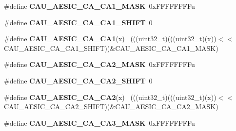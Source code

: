 \begin{DoxyCompactItemize}
\item 
\hypertarget{group___c_a_u___register___masks_gace8bbcda7b100e6febb77206a0b294ca}{}\#define {\bfseries C\+A\+U\+\_\+\+A\+E\+S\+I\+C\+\_\+\+C\+A\+\_\+\+C\+A1\+\_\+\+M\+A\+S\+K}~0x\+F\+F\+F\+F\+F\+F\+F\+Fu\label{group___c_a_u___register___masks_gace8bbcda7b100e6febb77206a0b294ca}

\item 
\hypertarget{group___c_a_u___register___masks_gaf213071e5350ac7fb8d15b65685e8fa8}{}\#define {\bfseries C\+A\+U\+\_\+\+A\+E\+S\+I\+C\+\_\+\+C\+A\+\_\+\+C\+A1\+\_\+\+S\+H\+I\+F\+T}~0\label{group___c_a_u___register___masks_gaf213071e5350ac7fb8d15b65685e8fa8}

\item 
\hypertarget{group___c_a_u___register___masks_gae23c1c036ff5b163a2fcfc170eb89e85}{}\#define {\bfseries C\+A\+U\+\_\+\+A\+E\+S\+I\+C\+\_\+\+C\+A\+\_\+\+C\+A1}(x)                                        ~(((uint32\+\_\+t)(((uint32\+\_\+t)(x))$<$$<$C\+A\+U\+\_\+\+A\+E\+S\+I\+C\+\_\+\+C\+A\+\_\+\+C\+A1\+\_\+\+S\+H\+I\+F\+T))\&C\+A\+U\+\_\+\+A\+E\+S\+I\+C\+\_\+\+C\+A\+\_\+\+C\+A1\+\_\+\+M\+A\+S\+K)\label{group___c_a_u___register___masks_gae23c1c036ff5b163a2fcfc170eb89e85}

\item 
\hypertarget{group___c_a_u___register___masks_gaacb6f7c612e15617ec7318cff9480c0f}{}\#define {\bfseries C\+A\+U\+\_\+\+A\+E\+S\+I\+C\+\_\+\+C\+A\+\_\+\+C\+A2\+\_\+\+M\+A\+S\+K}~0x\+F\+F\+F\+F\+F\+F\+F\+Fu\label{group___c_a_u___register___masks_gaacb6f7c612e15617ec7318cff9480c0f}

\item 
\hypertarget{group___c_a_u___register___masks_ga24294c0df349c7b5264631d50b683247}{}\#define {\bfseries C\+A\+U\+\_\+\+A\+E\+S\+I\+C\+\_\+\+C\+A\+\_\+\+C\+A2\+\_\+\+S\+H\+I\+F\+T}~0\label{group___c_a_u___register___masks_ga24294c0df349c7b5264631d50b683247}

\item 
\hypertarget{group___c_a_u___register___masks_gac53e6eb0ead797b56e9c2e44a149fd81}{}\#define {\bfseries C\+A\+U\+\_\+\+A\+E\+S\+I\+C\+\_\+\+C\+A\+\_\+\+C\+A2}(x)                                        ~(((uint32\+\_\+t)(((uint32\+\_\+t)(x))$<$$<$C\+A\+U\+\_\+\+A\+E\+S\+I\+C\+\_\+\+C\+A\+\_\+\+C\+A2\+\_\+\+S\+H\+I\+F\+T))\&C\+A\+U\+\_\+\+A\+E\+S\+I\+C\+\_\+\+C\+A\+\_\+\+C\+A2\+\_\+\+M\+A\+S\+K)\label{group___c_a_u___register___masks_gac53e6eb0ead797b56e9c2e44a149fd81}

\item 
\hypertarget{group___c_a_u___register___masks_ga889b99e5fda65da20c1e40cdf1633bdc}{}\#define {\bfseries C\+A\+U\+\_\+\+A\+E\+S\+I\+C\+\_\+\+C\+A\+\_\+\+C\+A3\+\_\+\+M\+A\+S\+K}~0x\+F\+F\+F\+F\+F\+F\+F\+Fu\label{group___c_a_u___register___masks_ga889b99e5fda65da20c1e40cdf1633bdc}


\end{DoxyCompactItemize}
